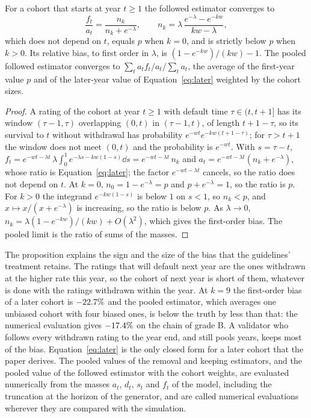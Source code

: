 \begin{proposition}\label{prop:later}
For a cohort that starts at year $t\ge1$ the followed estimator converges to
\begin{equation}
\frac{f_t}{a_t}=\frac{n_k}{n_k+e^{-\lambda}},\qquad n_k=\lambda\,\frac{e^{-\lambda}-e^{-kw}}{kw-\lambda},
\label{eq:later}
\end{equation}
which does not depend on $t$, equals $p$ when $k=0$, and is strictly below $p$ when $k>0$. Its relative bias, to first order in $\lambda$, is $(1-e^{-kw})/(kw)-1$. The pooled followed estimator converges to $\sum_t a_tf_t/a_t\big/\sum_ta_t$, the average of the first-year value $p$ and of the later-year value of Equation~\eqref{eq:later} weighted by the cohort sizes.
\end{proposition}

\begin{proof}
A rating of the cohort at year $t\ge1$ with default time $\tau\in(t,t+1]$ has its window $(\tau-1,\tau)$ overlapping $(0,t)$ in $(\tau-1,t)$, of length $t+1-\tau$, so its survival to $t$ without withdrawal has probability $e^{-wt}e^{-kw(t+1-\tau)}$; for $\tau>t+1$ the window does not meet $(0,t)$ and the probability is $e^{-wt}$. With $s=\tau-t$, $f_t=e^{-wt-\lambda t}\,\lambda\int_0^1e^{-\lambda s-kw(1-s)}\dd s=e^{-wt-\lambda t}\,n_k$ and $a_t=e^{-wt-\lambda t}(n_k+e^{-\lambda})$, whose ratio is Equation~\eqref{eq:later}; the factor $e^{-wt-\lambda t}$ cancels, so the ratio does not depend on $t$. At $k=0$, $n_0=1-e^{-\lambda}=p$ and $p+e^{-\lambda}=1$, so the ratio is $p$. For $k>0$ the integrand $e^{-kw(1-s)}$ is below $1$ on $s<1$, so $n_k<p$, and $x\mapsto x/(x+e^{-\lambda})$ is increasing, so the ratio is below $p$. As $\lambda\to0$, $n_k=\lambda(1-e^{-kw})/(kw)+O(\lambda^2)$, which gives the first-order bias. The pooled limit is the ratio of sums of the masses.
\end{proof}

The proposition explains the sign and the size of the bias that the guidelines' treatment retains. The ratings that will default next year are the ones withdrawn at the higher rate this year, so the cohort of next year is short of them, whatever is done with the ratings withdrawn within the year. At $k=9$ the first-order bias of a later cohort is $-22.7\%$ and the pooled estimator, which averages one unbiased cohort with four biased ones, is below the truth by less than that: the numerical evaluation gives $-17.4\%$ on the chain of grade B. A validator who follows every withdrawn rating to the year end, and still pools years, keeps most of the bias. Equation~\eqref{eq:later} is the only closed form for a later cohort that the paper derives. The pooled values of the removal and keeping estimators, and the pooled value of the followed estimator with the cohort weights, are evaluated numerically from the masses $a_t$, $d_t$, $s_t$ and $f_t$ of the model, including the truncation at the horizon of the generator, and are called numerical evaluations wherever they are compared with the simulation. %


